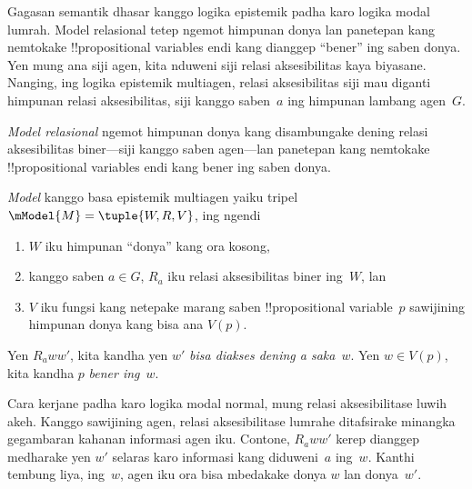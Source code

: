 \documentclass[../../../include/open-logic-section]{subfiles}
\begin{document}


Gagasan semantik dhasar kanggo logika epistemik padha karo logika
modal lumrah. Model relasional tetep ngemot himpunan donya lan
panetepan kang nemtokake !!{propositional
variable}s endi kang
dianggep ``bener'' ing saben donya. Yen mung ana siji agen, kita
nduweni siji relasi aksesibilitas kaya biyasane. Nanging, ing
logika epistemik multiagen, relasi aksesibilitas siji mau diganti
himpunan relasi aksesibilitas, siji kanggo saben~$a$ ing himpunan
lambang agen~$G$.

\emph{Model relasional} ngemot himpunan donya kang disambungake
dening relasi aksesibilitas biner---siji kanggo saben agen---lan
panetepan kang nemtokake !!{propositional variable}s endi kang
bener ing saben donya.

\begin{defn}
  \emph{Model} kanggo basa epistemik multiagen yaiku tripel
  $\mModel{M} = \tuple{W, R, V}$, ing ngendi
  \begin{enumerate}
  \item $W$ iku himpunan ``donya'' kang ora kosong,
  \item kanggo saben $a \in G$, ${R}_a$ iku relasi aksesibilitas biner
  ing~$W$, lan
  \item $V$ iku fungsi kang netepake marang saben !!{propositional
    variable}~$p$ sawijining himpunan donya kang bisa ana $V(p)$.
  \end{enumerate}
  Yen $R_a ww'$, kita kandha yen $w'$ \emph{bisa diakses dening a
    saka}~$w$. Yen $w \in V(p)$, kita kandha $p$ \emph{bener ing}~$w$.
\end{defn}

Cara kerjane padha karo logika modal normal, mung relasi
aksesibilitase luwih akeh. Kanggo sawijining agen, relasi
aksesibilitase lumrahe ditafsirake minangka gegambaran kahanan
informasi agen iku. Contone, $R_a ww'$ kerep dianggep medharake
yen $w'$ selaras karo informasi kang diduweni~$a$ ing~$w$.
Kanthi tembung liya, ing~$w$, agen iku ora bisa mbedakake donya
$w$ lan donya~$w'$.
\end{document}
